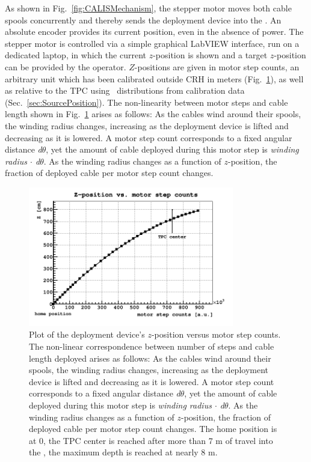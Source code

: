 As shown in Fig.~\ref{fig:CALISMechanism}, the stepper motor moves both cable spools concurrently and thereby sends the deployment device into the \lsv. An absolute encoder provides its current position, even in the absence of power. The stepper motor is controlled via a simple graphical LabVIEW interface, run on a dedicated laptop, in which the current $z$-position is shown and a target $z$-position can be provided by the operator. $Z$-positions are given in motor step counts, an arbitrary unit which has been calibrated outside CRH in meters (Fig.~\ref{fig:z_test}), as well as relative to the TPC using \tdrift\ distributions from calibration data (Sec.~\ref{sec:SourcePosition}). \label{sec:Nonlinearity:MotorStepCounts}
The non-linearity between motor steps and cable length shown in Fig.~\ref{fig:z_test} arises as follows: As the cables wind around their spools, the winding radius changes, increasing as the deployment device is lifted and decreasing as it is lowered. A motor step count corresponds to a fixed angular distance \textit{d$\theta$}, yet the amount of cable deployed during this motor step is \textit{winding radius $\cdot$ d$\theta$}. As the winding radius changes as a function of $z$-position, the fraction of deployed cable per motor step count changes.

\begin{figure}[htbp]
 \centering
 \includegraphics[width=0.8\textwidth]{Figures/MSC_Z}
 \caption{Plot of the deployment device's $z$-position versus motor step counts. The non-linear correspondence between number of steps and cable length deployed arises as follows: As the cables wind around their spools, the winding radius changes, increasing as the deployment device is lifted and decreasing as it is lowered. A motor step count corresponds to a fixed angular distance \textit{d$\theta$}, yet the amount of cable deployed during this motor step is \textit{winding radius $\cdot$ d$\theta$}. As the winding radius changes as a function of $z$-position, the fraction of deployed cable per motor step count changes. The home position is at 0, the TPC center is reached after more than 7 m of travel into the \lsv, the maximum depth is reached at nearly 8 m.}
 \label{fig:z_test}
\end{figure}


